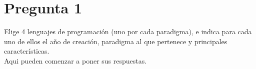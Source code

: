 \section*{Pregunta 1}
\Large 
Elige 4 lenguajes de programación (uno por cada paradigma), e indica para cada uno de ellos el año de creación, paradigma al que pertenece y principales características.\\
\newline
\large
Aqui pueden comenzar a poner sus respuestas.

